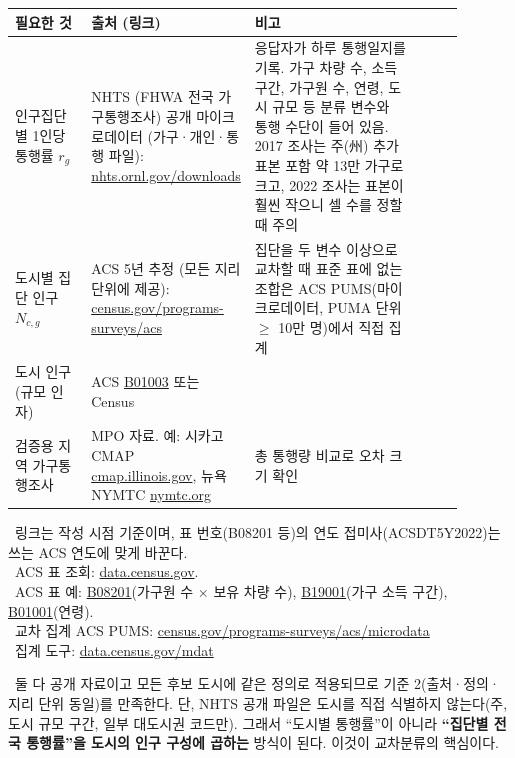 \documentclass[10pt,a4paper]{article}
\newcommand{\note}{\textreferencemark\ }
\begin{document}
{\small
\begin{tabularx}{\linewidth}{@{}>{\raggedright\arraybackslash}p{0.17\linewidth}>{\raggedright\arraybackslash}p{0.35\linewidth}>{\raggedright\arraybackslash}p{0.37\linewidth}Y@{}}
\toprule
필요한 것 & 출처 (링크) & 비고 \\ 
\midrule
인구집단별 1인당 통행률 $r_g$
  & NHTS (FHWA 전국 가구통행조사) 공개 마이크로데이터 (가구·개인·통행 파일): \href{https://nhts.ornl.gov/downloads}{nhts.ornl.gov/downloads}
  & 응답자가 하루 통행일지를 기록. 가구 차량 수, 소득 구간, 가구원 수, 연령, 도시 규모 등 분류 변수와 통행 수단이 들어 있음. 2017 조사는 주(州) 추가표본 포함 약 13만 가구로 크고, 2022 조사는 표본이 훨씬 작으니 셀 수를 정할 때 주의 \\
\midrule  
도시별 집단 인구 $N_{c,g}$
  & ACS 5년 추정 (모든 지리 단위에 제공): \href{https://www.census.gov/programs-surveys/acs}{census.gov/programs-surveys/acs}
  & 집단을 두 변수 이상으로 교차할 때 표준 표에 없는 조합은 ACS PUMS(마이크로데이터, PUMA 단위 $\ge$ 10만 명)에서 직접 집계 \\
\midrule
도시 인구(규모 인자)
  & ACS \href{https://data.census.gov/table/ACSDT5Y2022.B01003}{B01003} 또는 Census
  & \\
검증용 지역 가구통행조사
  & MPO 자료. 예: 시카고 CMAP \href{https://www.cmap.illinois.gov/}{cmap.illinois.gov}, 뉴욕 NYMTC \href{https://www.nymtc.org/}{nymtc.org}
  & 총 통행량 비교로 오차 크기 확인 \\
\bottomrule
\end{tabularx}
}

\note 링크는 작성 시점 기준이며, 표 번호(B08201 등)의 연도 접미사(ACSDT5Y2022)는 쓰는 ACS 연도에 맞게 바꾼다. \\
\note ACS 표 조회: \href{https://data.census.gov/}{data.census.gov}. \\ 
\note ACS 표 예: \href{https://data.census.gov/table/ACSDT5Y2022.B08201}{B08201}(가구원 수 $\times$ 보유 차량 수), \href{https://data.census.gov/table/ACSDT5Y2022.B19001}{B19001}(가구 소득 구간), \href{https://data.census.gov/table/ACSDT5Y2022.B01001}{B01001}(연령). \\ 
\note 교차 집계 ACS PUMS: \href{https://www.census.gov/programs-surveys/acs/microdata.html}{census.gov/programs-surveys/acs/microdata} \\ 
\note 집계 도구: \href{https://data.census.gov/mdat/}{data.census.gov/mdat}

\note 둘 다 공개 자료이고 모든 후보 도시에 같은 정의로 적용되므로 기준 2(출처·정의·지리 단위 동일)를 만족한다. 단, NHTS 공개 파일은 도시를 직접 식별하지 않는다(주, 도시 규모 구간, 일부 대도시권 코드만). 그래서 ``도시별 통행률''이 아니라 \textbf{``집단별 전국 통행률''을 도시의 인구 구성에 곱하는} 방식이 된다. 이것이 교차분류의 핵심이다.
\end{document}
